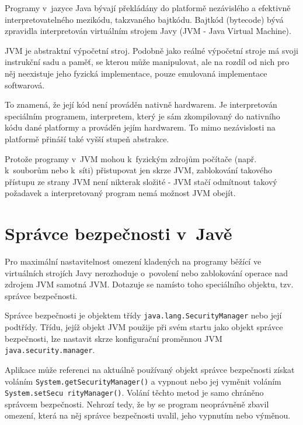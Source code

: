Programy v~jazyce Java bývají překládány do platformě nezávislého a efektivně interpretovatelného mezikódu, takzvaného bajtkódu.
Bajtkód (bytecode) bývá zpravidla interpretován virtuálním strojem Javy (JVM - Java Virtual Machine).
\cite{jvmIntro}

JVM je abstraktní výpočetní stroj. Podobně jako reálné výpočetní stroje má svoji instrukční sadu a paměť, se kterou může manipulovat, ale na rozdíl od nich pro něj neexistuje jeho fyzická implementace, pouze emulovaná implementace softwarová.
\cite{jvmIntro}

To znamená, že její kód není prováděn nativně hardwarem. Je interpretován speciálním programem, interpretem, který je sám zkompilovaný do nativního kódu dané platformy a prováděn jejím hardwarem.
To mimo nezávislosti na platformě přináší také vyšší stupeň abstrakce.
\cite{jvmIntro}

Protože programy v~JVM mohou k~fyzickým zdrojům počítače (např. k~souborům nebo k~síti) přistupovat jen skrze JVM, zablokování takového přístupu ze strany JVM není nikterak složité - JVM stačí odmítnout takový požadavek a interpretovaný program nemá možnost JVM obejít.

\section{Správce bezpečnosti v~Javě} \label{securityManager}

Pro maximální nastavitelnost omezení kladených na programy běžící ve virtuálních strojích Javy nerozhoduje o~povolení nebo zablokování operace nad zdrojem JVM samotná JVM. Dotazuje se namísto toho speciálního objektu, tzv. správce bezpečnosti. \cite{tutorialsTSM}

Správce bezpečnosti je objektem třídy {\tt java.lang.SecurityManager} nebo její podtřídy.
Třídu, jejíž objekt JVM použije při svém startu jako objekt správce bezpečnosti, lze nastavit skrze konfigurační proměnnou JVM {\tt java.security.manager}. \cite{javaSecurityArch}

Aplikace může referenci na aktuálně používaný objekt správce bezpečnosti získat voláním {\tt System.getSecurityManager()} a vypnout nebo jej vyměnit voláním {\tt System.setSecu rityManager()}. Volání těchto metod je samo chráněno správcem bezpečnosti.
Nehrozí tedy, že by se program neoprávněně zbavil omezení, která na něj správce bezpečnosti uvalil, jeho vypnutím nebo výměnou.
\cite{tutorialsTSM}

